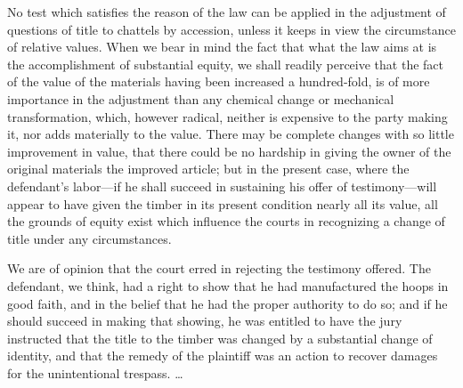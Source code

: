 No test which satisfies the reason of the law can be applied in the adjustment
of questions of title to chattels by accession, unless it keeps in view the
circumstance of relative values. When we bear in mind the fact that what the
law aims at is the accomplishment of substantial equity, we shall readily
perceive that the fact of the value of the materials having been increased a
hundred-fold, is of more importance in the adjustment than any chemical change
or mechanical transformation, which, however radical, neither is expensive to
the party making it, nor adds materially to the value. There may be complete
changes with so little improvement in value, that there could be no hardship in
giving the owner of the original materials the improved article; but in the
present case, where the defendant's labor---if he shall succeed in sustaining
his offer of testimony---will appear to have given the timber in its present
condition nearly all its value, all the grounds of equity exist which influence
the courts in recognizing a change of title under any circumstances.

We are of opinion that the court erred in rejecting the testimony offered. The
defendant, we think, had a right to show that he had manufactured the hoops in
good faith, and in the belief that he had the proper authority to do so; and if
he should succeed in making that showing, he was entitled to have the jury
instructed that the title to the timber was changed by a substantial change of
identity, and that the remedy of the plaintiff was an action to recover damages
for the unintentional trespass. \ldots

